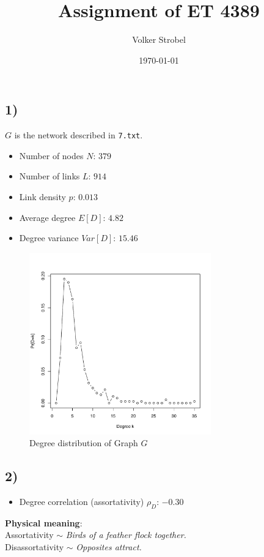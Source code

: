 \documentclass{article}
\title{Assignment of ET 4389}
\author{Volker Strobel}
\date{\today}
\begin{document}
\maketitle
\subsection*{1)}
$G$ is the network described in \texttt{7.txt}.

\begin{itemize}
  \item Number of nodes $N$: $379$ 
  \item Number of links $L$: $914$
  \item Link density $p$: $0.013$
  \item Average degree $E[D]$: $4.82$
  \item Degree variance $Var[D]$: $15.46$
\end{itemize}

\begin{figure}[H]
  \centering
  \includegraphics[width=0.7\textwidth]{degree_distribution}
  \caption{Degree distribution of Graph $G$}
\end{figure}

\subsection*{2)}

\begin{itemize}
\item Degree correlation (assortativity) $\rho_D$: $-0.30$
\end{itemize}
\textbf{Physical meaning}:\\
Assortativity $\sim$ \emph{Birds of a feather flock together.}\\
Disassortativity $\sim$ \emph{Opposites attract.}
\end{document}
